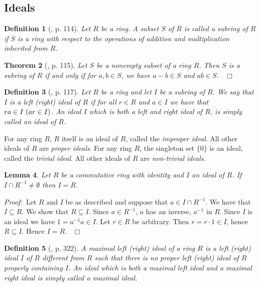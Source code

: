 \documentclass[12pt, oneside]{book}
\newtheorem{theorem}{Theorem}[subsection]
\newtheorem{lemma}[theorem]{Lemma}
\newtheorem{definition}[theorem]{Definition}
\newcommand{\proof}{{\noindent \it Proof:~}}
\newcommand{\qed}{\hfill ~$\Box$\\}
\begin{document}
\subsection{Ideals}
\begin{definition}[\cite{G1},  p. 114]
\normalfont
\noindent Let $R$ be a ring. A subset $S$ of $R$ is called a {\sl subring} of $R$ if $S$ is a ring 
with respect to the operations of addition and multiplication inherited from $R$. 
\end{definition}

\begin{theorem} [\cite{G1}, p. 115]\label{SubringTest}
\normalfont
\noindent Let $S$ be a nonempty subset of a ring $R$. Then $S$ is a subring of $R$ if and only if 
for $a, b \in S$, we have $a - b \in S$ and $ab \in S$. \qed
\end{theorem}

\begin{definition}[\cite{G1},  p. 117] 
\normalfont
\noindent Let $R$ be a ring and let $I$ be a subring of $R$. We say that $I$ is a 
{\sl left (right) ideal} of $R$ if for all $r \in R$ and $a \in I$ we have 
that $ra \in I \text{\space} (ar \in I)$. 
An ideal $I$ which is both a left and right ideal of $R$, is simply called an {\sl ideal} of $R$.

\end{definition}

\noindent For any ring $R$, $R$ itself is an ideal of $R$, called the {\sl improper ideal}. 
All other ideals of $R$ are {\sl proper ideals}. For any ring $R$, the singleton set $\{ 0 \}$ is 
an ideal, called the {\sl trivial ideal}. All other ideals of $R$ are {\sl non-trivial ideals}.

\begin{lemma} \label{ProperIdeal}
\normalfont
\noindent Let $R$ be a commutative ring with identity and $I$ an ideal of $R$. 
If $I \cap R^{-1} \neq \emptyset$ then $I = R$.
\end{lemma}
\proof \space Let $R$ and $I$ be as described and suppose that $a \in I \cap R^{-1}$. 
We have that $I \subseteq R$. We show that $R \subseteq I$. Since $a \in R^{-1}$, $a$ has an inverse, 
$a^{-1}$ in $R$. Since $I$ is an ideal we have $1 = a^{-1}a \in I$. Let $r \in R$ be arbitrary. Then 
$r = r \cdot 1 \in I$, hence $R \subseteq I$. Hence $I = R$. \qed
\begin{definition}[\cite{F}, p. 322] 
\normalfont
A {\sl maximal left (right) ideal} of a ring $R$ is a left (right) ideal $I$ of $R$ different 
from $R$ such that there is no proper left (right) ideal of $R$ properly containing $I$. 
An ideal which is both a maximal left ideal and a maximal right ideal is simply called a 
maximal ideal.

\end{definition}
\end{document}
